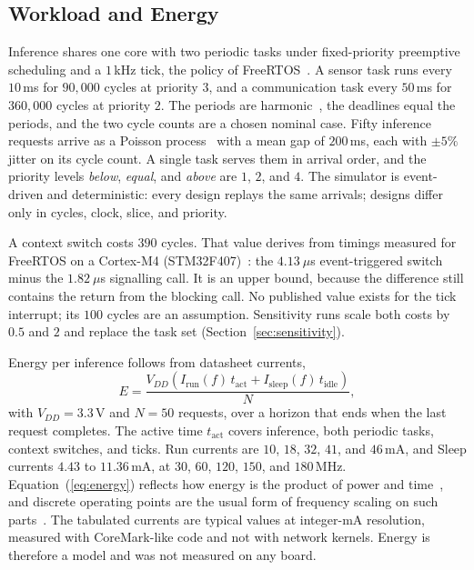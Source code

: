 \subsection{Workload and Energy}
\label{sec:workload}
Inference shares one core with two periodic tasks under fixed-priority
preemptive scheduling and a $1$\,kHz tick, the policy of
FreeRTOS~\cite{oliveira2023freertos}. A sensor task runs every $10$\,ms for
$90{,}000$ cycles at priority $3$, and a communication task every $50$\,ms for
$360{,}000$ cycles at priority $2$. The periods are harmonic~\cite{pavic2020periods},
the deadlines equal the periods, and the two cycle counts are a chosen
nominal case. Fifty inference requests arrive as a Poisson
process~\cite{he2020poisson} with a mean gap of $200$\,ms, each with $\pm5\%$
jitter on its cycle count. A single task serves them in arrival order, and the
priority levels \emph{below}, \emph{equal}, and \emph{above} are $1$, $2$,
and $4$. The simulator is event-driven and deterministic: every design
replays the same arrivals; designs differ only in cycles, clock, slice, and
priority.

A context switch costs $390$ cycles. That value derives from timings
measured for FreeRTOS on a Cortex-M4 (STM32F407)~\cite{ungurean2020rtos}: the
$4.13~\mu$s event-triggered switch minus the $1.82~\mu$s signalling call. It is an
upper bound, because the difference still contains the return from the
blocking call. No published value exists for the tick interrupt; its
$100$ cycles are an assumption. Sensitivity runs scale both costs by $0.5$
and $2$ and replace the task set (Section~\ref{sec:sensitivity}).

Energy per inference follows from datasheet currents,
\begin{equation}
E=\frac{V_{DD}\left(I_{\mathrm{run}}(f)\,t_{\mathrm{act}}+I_{\mathrm{sleep}}(f)\,t_{\mathrm{idle}}\right)}{N},
\label{eq:energy}
\end{equation}
with $V_{DD}=3.3$\,V and $N=50$ requests, over a horizon that ends when the
last request completes. The active time $t_{\mathrm{act}}$ covers
inference, both periodic tasks, context switches, and ticks. Run currents are
$10$, $18$, $32$, $41$, and $46$\,mA, and Sleep currents $4.43$ to
$11.36$\,mA, at $30$, $60$, $120$, $150$, and $180$\,MHz. Equation~(\ref{eq:energy}) reflects
how energy is the product of power and time~\cite{wu2021energy}, and
discrete operating points are the usual form of frequency scaling on such
parts~\cite{zidar2024energy}. The tabulated currents are typical values at
integer-mA resolution, measured with CoreMark-like code and not with network
kernels. Energy is therefore a model and was not measured on any board.

